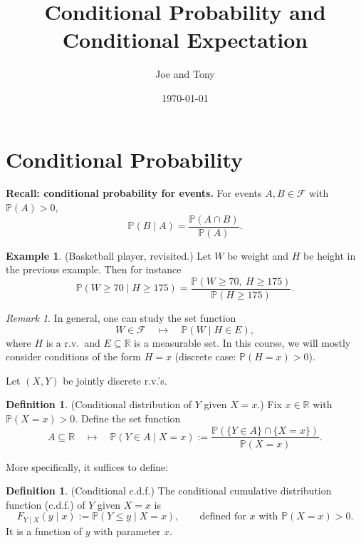 \documentclass[11pt]{article}
\title{Conditional Probability and Conditional Expectation }
\author{Joe and Tony}
\date{\today}
\theoremstyle{plain}
\theoremstyle{definition}
\newtheorem{definition}[theorem]{Definition}
\newtheorem{example}[theorem]{Example}
\theoremstyle{remark}
\newtheorem{remark}[theorem]{Remark}
\newcommand{\R}{\mathbb{R}}
\begin{document}
	\maketitle
	\tableofcontents
	
	
	
	\section{Conditional Probability}
	
	\textbf{Recall: conditional probability for events.}
	For events \(A,B\in\mathcal{F}\) with \(\mathbb{P}(A)>0\),
	\[
	\mathbb{P}(B\mid A)=\frac{\mathbb{P}(A\cap B)}{\mathbb{P}(A)}.
	\]
	
	\begin{example}
		(Basketball player, revisited.)
		Let \(W\) be weight and \(H\) be height in the previous example.
		Then for instance
		\[
		\mathbb{P}(W\ge 70\mid H\ge 175)
		=\frac{\mathbb{P}(W\ge 70,\ H\ge 175)}{\mathbb{P}(H\ge 175)}.
		\]
	\end{example}
	
	\begin{remark}
		In general, one can study the set function
		\[
		W\in\mathcal{F}\quad \longmapsto\quad \mathbb{P}(W\mid H\in E),
		\]
		where \(H\) is a r.v.\ and \(E\subseteq\R\) is a measurable set.
		In this course, we will mostly consider conditions of the form \(H=x\) (discrete case: \(\mathbb{P}(H=x)>0\)).
	\end{remark}
	
	
	
	Let \((X,Y)\) be jointly discrete r.v.'s.
	
	\begin{definition}
		(Conditional distribution of \(Y\) given \(X=x\).)
		Fix \(x\in\R\) with \(\mathbb{P}(X=x)>0\).
		Define the set function
		\[
		A\subseteq \R \quad \longmapsto \quad \mathbb{P}(Y\in A\mid X=x)
		:=\frac{\mathbb{P}(\{Y\in A\}\cap\{X=x\})}{\mathbb{P}(X=x)}.
		\]
	\end{definition}
	
	More specifically, it suffices to define:
	
	\begin{definition}
		(Conditional c.d.f.)
		The conditional cumulative distribution function (c.d.f.) of \(Y\) given \(X=x\) is
		\[
		F_{Y\mid X}(y\mid x):=\mathbb{P}(Y\le y\mid X=x),
		\qquad \text{defined for \(x\) with \(\mathbb{P}(X=x)>0\).}
		\]
		It is a function of \(y\) with parameter \(x\).
	\end{definition}
	
\end{document}
